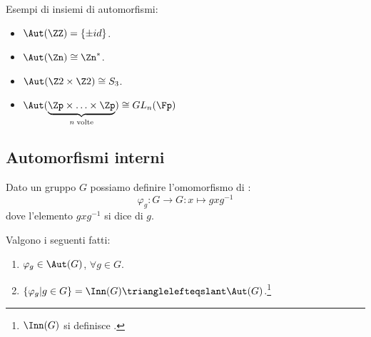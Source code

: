 \documentclass[11pt]{scrartcl}
\begin{document}
\begin{example}
    Esempi di insiemi di automorfismi:
        \begin{itemize}
            \item $\Aut(\ZZ) = \{\pm id\}$.
            \item $\Aut(\Zn) \cong \Zn^*$.
            \item $\Aut(\Z2 \times \Z2) \cong S_3$.
            \item $\Aut(\underbrace{\Zp \times \ldots \times \Zp}_{n \;\text{volte}}) \cong GL_n(\Fp)$
        \end{itemize}
\end{example}

\subsection{Automorfismi interni}
\begin{definition}
    Dato un gruppo $G$ possiamo definire l'omomorfismo di :
        \[ \varphi_g : G \longrightarrow G : x \longmapsto gxg^{-1}
            \]
    dove l'elemento $gxg^{-1}$ si dice  di $g$.
\end{definition}

\begin{proposition}
    \label{prop1}
    Valgono i seguenti fatti:
    \begin{enumerate}[(1)]
        \item $\varphi_g \in \Aut(G)$, $\forall g \in G$.
        \item $\{\varphi_g | g \in G\} = \Inn(G) \trianglelefteqslant \Aut(G)$.\footnote{$\Inn(G)$ si definisce .}
    \end{enumerate}
\end{proposition}
\end{document}
